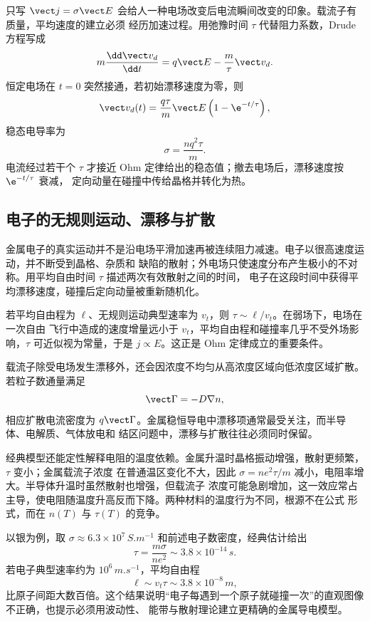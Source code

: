只写 $\vect j=\sigma\vect E$ 会给人一种电场改变后电流瞬间改变的印象。载流子有质量，平均速度的建立必须
经历加速过程。用弛豫时间 $\tau$ 代替阻力系数，Drude 方程写成
\begin{equation}
  m\frac{\dd\vect v_d}{\dd t}
  =q\vect E-\frac m\tau\vect v_d.
\end{equation}
恒定电场在 $t=0$ 突然接通，若初始漂移速度为零，则
\begin{equation}
  \vect v_d(t)=\frac{q\tau}{m}\vect E\left(1-\e^{-t/\tau}\right),
\end{equation}
稳态电导率为
\begin{equation}
  \boxed{\sigma=\frac{nq^2\tau}{m}}.
\end{equation}
电流经过若干个 $\tau$ 才接近 Ohm 定律给出的稳态值；撤去电场后，漂移速度按 $\e^{-t/\tau}$ 衰减，
定向动量在碰撞中传给晶格并转化为热。

\subsection*{电子的无规则运动、漂移与扩散}

金属电子的真实运动并不是沿电场平滑加速再被连续阻力减速。电子以很高速度运动，并不断受到晶格、杂质和
缺陷的散射；外电场只使速度分布产生极小的不对称。用平均自由时间 $\tau$ 描述两次有效散射之间的时间，
电子在这段时间中获得平均漂移速度，碰撞后定向动量被重新随机化。

\drudeDiagram

若平均自由程为 $\ell$、无规则运动典型速率为 $v_t$，则 $\tau\sim\ell/v_t$。在弱场下，电场在一次自由
飞行中造成的速度增量远小于 $v_t$，平均自由程和碰撞率几乎不受外场影响，$\tau$ 可近似视为常量，于是
$j\propto E$。这正是 Ohm 定律成立的重要条件。

载流子除受电场发生漂移外，还会因浓度不均匀从高浓度区域向低浓度区域扩散。若粒子数通量满足
\begin{equation}
  \vect\Gamma=-D\nabla n,
\end{equation}
相应扩散电流密度为 $q\vect\Gamma$。金属稳恒导电中漂移项通常最受关注，而半导体、电解质、气体放电和
结区问题中，漂移与扩散往往必须同时保留。

经典模型还能定性解释电阻的温度依赖。金属升温时晶格振动增强，散射更频繁，$\tau$ 变小；金属载流子浓度
在普通温区变化不大，因此 $\sigma=ne^2\tau/m$ 减小，电阻率增大。半导体升温时虽然散射也增强，但载流子
浓度可能急剧增加，这一效应常占主导，使电阻随温度升高反而下降。两种材料的温度行为不同，根源不在公式
形式，而在 $n(T)$ 与 $\tau(T)$ 的竞争。

以银为例，取 $\sigma\approx6.3\times10^7\,\si{S.m^{-1}}$ 和前述电子数密度，经典估计给出
\begin{equation}
  \tau=\frac{m\sigma}{ne^2}\sim3.8\times10^{-14}\,\si{s}.
\end{equation}
若电子典型速率约为 $10^6\,\si{m.s^{-1}}$，平均自由程
\begin{equation}
  \ell\sim v_t\tau\sim3.8\times10^{-8}\,\si{m},
\end{equation}
比原子间距大数百倍。这个结果说明“电子每遇到一个原子就碰撞一次”的直观图像不正确，也提示必须用波动性、
能带与散射理论建立更精确的金属导电模型。

